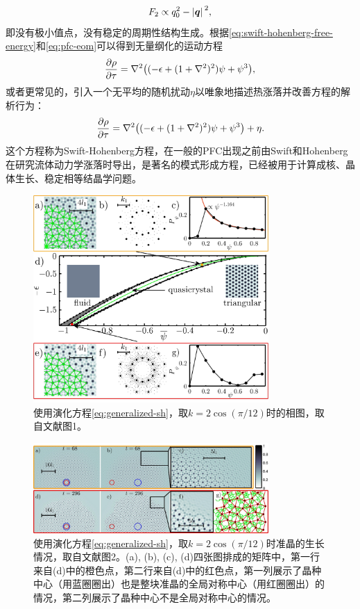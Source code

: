 \documentclass[hyperref, UTF8, a4paper]{ctexart}
\begin{document}
\[
    F_2 \propto q_0^2 - \abs*{\vb*{q}}^2,
\]
即没有极小值点，没有稳定的周期性结构生成。根据\eqref{eq:swift-hohenberg-free-energy}和\eqref{eq:pfc-eom}可以得到无量纲化的运动方程
\[
    \pdv{\rho}{\tau} = \laplacian ((- \epsilon + (1 + \laplacian)^2) \psi + \psi^3),
\]
或者更常见的，引入一个无平均的随机扰动$\eta$以唯象地描述热涨落并改善方程的解析行为\cite{PhysRevLett.88.245701}：
\begin{equation}
    \pdv{\rho}{\tau} = \laplacian ((- \epsilon + (1 + \laplacian)^2) \psi + \psi^3) + \eta.
\end{equation}
这个方程称为Swift-Hohenberg方程，在一般的PFC出现之前由Swift和Hohenberg在研究流体动力学涨落时导出\cite{PhysRevA.15.319}，是著名的模式形成方程\cite{phasediffusion2012}，已经被用于计算成核、晶体生长、稳定相等结晶学问题\cite{PhysRevLett.88.245701,PhysRevE.70.051605}。%

\begin{figure}
    \centering
    \includegraphics[width=0.8\textwidth]{phase-diagram.png}
    \caption{使用演化方程\eqref{eq:generalized-sh}，取$k = 2 \cos(\pi / 12)$时的相图，取自文献\cite{PhysRevLett.112.255501}图1。}
    \label{fig:phase-diagram}
\end{figure}

\begin{figure}
    \centering
    \includegraphics[width=0.8\textwidth]{growth.png}
    \caption{使用演化方程\eqref{eq:generalized-sh}，取$k = 2 \cos(\pi / 12)$时准晶的生长情况，取自文献\cite{PhysRevLett.112.255501}图2。(a), (b), (c), (d)四张图排成的矩阵中，第一行来自(d)中的橙色点，第二行来自(d)中的红色点，第一列展示了晶种中心（用蓝圈圈出）也是整块准晶的全局对称中心（用红圈圈出）的情况，第二列展示了晶种中心不是全局对称中心的情况。}
    \label{fig:evolution}
\end{figure}
\end{document}
